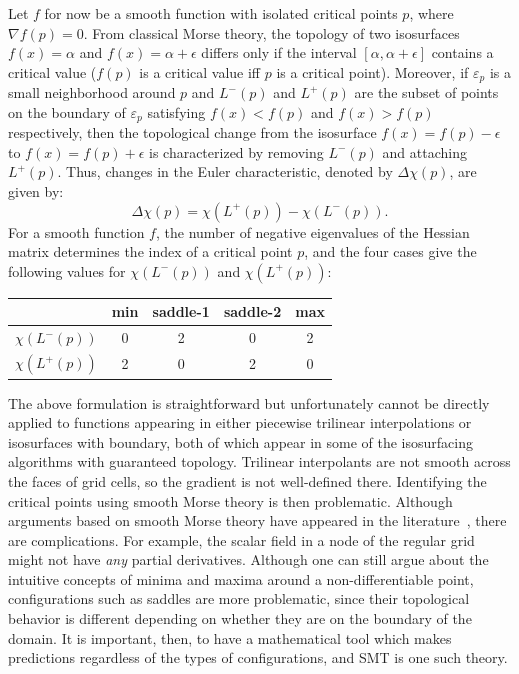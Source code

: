 Let $f$ for now be a smooth function with isolated critical points
$p$, where $\nabla f(p) = 0$.  From classical Morse theory, the
topology of two isosurfaces $f(x)=\alpha$ and $f(x)=\alpha+\epsilon$
differs only if the interval $[\alpha, \alpha + \epsilon]$ contains a
critical value ($f(p)$ is a critical value iff $p$ is a critical
point). Moreover, if $\varepsilon_p$ is a small neighborhood around
$p$ and $L^-(p)$ and $L^+(p)$ are the subset of points on the boundary
of $\varepsilon_p$ satisfying $f(x)<f(p)$ and $f(x)>f(p)$
respectively, then the topological change from the isosurface
$f(x)=f(p)-\epsilon$ to $f(x)=f(p)+\epsilon$ is characterized by
removing $L^-(p)$ and attaching $L^+(p)$. Thus, changes in the Euler
characteristic, denoted by $\Delta\chi(p)$, are given by:
\begin{equation}
\Delta\chi(p) = \chi(L^+(p)) - \chi(L^-(p)).
\label{eq:deltachi}
\end{equation}
\noindent For a smooth function $f$, the number of negative eigenvalues of the
Hessian matrix determines the index of a critical point $p$, and the
four cases give the following values for $\chi(L^-(p))$
and $\chi(L^+(p))$:
\begin{center}
\begin{tabular}{c|c|c|c|c}
& min & saddle-1 & saddle-2 & max \\
\hline
$\chi(L^-(p))$ & 0 & 2 & 0 & 2 \\ 
$\chi(L^+(p))$ & 2 & 0 & 2 & 0
\end{tabular}
\end{center}
The above formulation is straightforward but unfortunately cannot be directly applied to
functions appearing in either piecewise trilinear interpolations or
isosurfaces with boundary, both of which
appear in some of the isosurfacing algorithms with guaranteed
topology. Trilinear interpolants are not smooth across the faces
of grid cells, so the gradient is not well-defined there. Identifying the
critical points using smooth Morse theory is then
problematic. Although arguments based on smooth Morse
theory have appeared in the
literature~\cite{Weber:2002:ESF}, there are complications. For
example, the scalar field in a node
of the regular grid might not have \emph{any} partial
derivatives. Although one can still argue about the
intuitive concepts of minima and maxima around a non-differentiable point,
configurations such as saddles are more problematic, since their
topological behavior is different depending on whether they are on the
boundary of the domain. It is 
important, then, to have a mathematical tool which makes predictions
regardless of the types of configurations, and SMT is one such theory.

